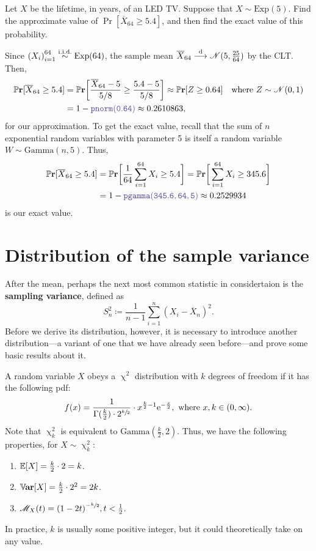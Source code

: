 \begin{example}
    Let \(X\) be the lifetime, in years, of an LED TV. 
    Suppose that \(X\sim \mathrm{Exp}(5)\). 
    Find the approximate value of \(\Pr[\overline{X}_{64} \geq 5.4]\), and then find the exact value of this probability. 

    Since \({(X_i)}_{i=1}^{64}\stackrel{\mathrm{i.i.d.}}{\sim} \mathrm{Exp}(64)\), the sample mean \(\overline{X}_{64}\overset{\mathrm{d}}{\longrightarrow} \mathscr{N}(5, \frac{25}{64})\) by the CLT. 
    Then,\begin{align*}
    \Pr[\overline{X}_{64} \geq 5.4] &= \Pr\bigg[\frac{\overline{X}_{64} - 5}{5/8} \geq \frac{5.4-5}{5/8}\bigg] \approx \Pr[Z \geq 0.64]&\text{where}~Z\sim \mathscr{N}(0,1)\\
    &= 1 - \code{pnorm(0.64)} \approx 0.2610863,\end{align*}for our approximation. 
    To get the exact value, recall that the sum of \(n\) exponential random variables with parameter 5 is itself a random variable \(W\sim \mathrm{Gamma}(n,5)\). Thus,\begin{align*}
        \Pr[\overline{X}_{64} \geq 5.4] &= \Pr\bigg[\frac{1}{64} \sum_{i=1}^{64} X_i \geq 5.4\bigg] = \Pr\bigg[\sum_{i=1}^{64} X_i \geq 345.6\bigg] \\
        &= 1- \code{pgamma(345.6, 64, 5)} \approx 0.2529934
    \end{align*}is our exact value. 
\end{example}

\section{Distribution of the sample variance} 
After the mean, perhaps the next most common statistic in considertaion is the \textbf{sampling variance}, defined as\[
    S_n^2 \coloneq \frac{1}{n-1} \sum_{i=1}^n {(X_i - \overline{X}_n)}^2.
\]Before we derive its distribution, however, it is necessary to introduce another distribution---a variant of one that we have already seen before---and prove some basic results about it. 

A random variable \(X\) obeys a \(\upchi^2\) distribution with \(k\) degrees of freedom  if it has the following pdf:\[
    f(x) = \frac{1}{\Gamma (\frac{k}{2}) \cdot 2^{\sfrac{k}{2}}} \cdot x^{\frac{k}{2} -1} \mathrm{e}^{-\frac{x}{2}},~\text{where}~x,k\in (0,\infty).  
\]Note that \(\upchi_k^2\) is equivalent to \(\mathrm{Gamma}(\frac{k}{2},2)\). 
Thus, we have the following properties, for \(X\sim \upchi_k^2\):\begin{enumerate}
    \item \(\mathbb{E}[X] = \frac{k}{2} \cdot 2 = k\). 
    \item \(\mathbb{V}\hspace{-1pt}\mathbf{ar}[X] = \frac{k}{2} \cdot 2^2 = 2k\). 
    \item \(\mathscr{M}_X (t) = {(1-2t)}^{-\sfrac{k}{2}}, t<\frac{1}{2}\). 
\end{enumerate}
In practice, \(k\) is usually some positive integer, but it could theoretically take on any value. 

